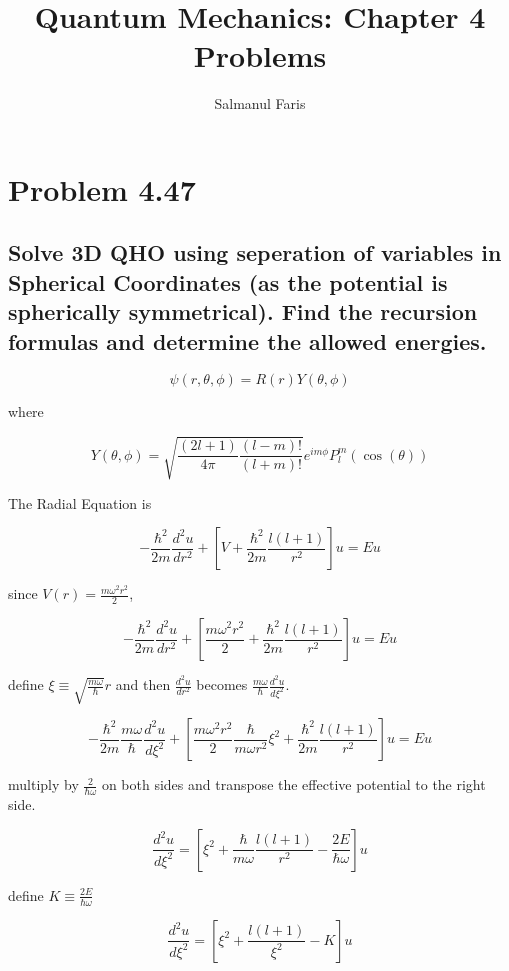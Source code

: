 \documentclass[a4paper,15pt]{article}
\title{Quantum Mechanics: Chapter 4 Problems}
\author{Salmanul Faris}
\begin{document}
\maketitle

\section*{Problem 4.47}
\subsection*{Solve 3D QHO using seperation of variables in
Spherical Coordinates (as the potential is spherically symmetrical).
Find the recursion formulas and determine the allowed energies.}

\begin{equation}
  \psi(r, \theta, \phi) = R(r)Y(\theta, \phi)
\end{equation}

where

\begin{equation}
  Y(\theta, \phi) = \sqrt{\frac{(2l+1)}{4\pi}\frac{(l-m)!}
  {(l+m)!}}e^{im\phi}P^m_l(\cos(\theta))
\end{equation}

The Radial Equation is

\[
  -\frac{\hbar^2}{2m}\frac{d^2u}{dr^2}+\left[V+\frac{\hbar^2}{2m}\frac{l(l+1)}{r^2}\right]
  u = Eu
\]

since $V(r)=\frac{m\omega^2r^2}{2}$,

\[
  -\frac{\hbar^2}{2m}\frac{d^2u}{dr^2}+\left[\frac{m\omega^2r^2}{2}+\frac{\hbar^2}{2m}\frac{l(l+1)}{r^2}\right]
  u = Eu
\]

define \(\xi \equiv \sqrt{\frac{m \omega}{\hbar}}r\) and then \(\frac{d^2u}{dr^2}\) becomes
\( \frac{m\omega}{\hbar}\frac{d^2u}{d\xi^2} \).

\[
  -\frac{\hbar^2}{2m}\frac{m\omega}{\hbar}\frac{d^2u}{d\xi^2}+\left[\frac
  {m\omega^2r^2}{2}\frac{\hbar}{m \omega r^2} \xi^2+\frac{\hbar^2}{2m}\frac{l(l+1)}{r^2}\right]u = Eu
\]

multiply by \(\frac{2}{\hbar \omega}\) on both sides and transpose
the effective potential to the right side.

\[
  \frac{d^2u}{d\xi^2}=\left[\xi^2+\frac{\hbar}{m \omega}\frac{l(l+1)}{r^2}
  -\frac{2E}{\hbar \omega}\right]u
\]

define \(K \equiv \frac{2E}{\hbar \omega}\)

\begin{equation}
  \frac{d^2u}{d\xi^2}=\left[\xi^2+\frac{l(l+1)}{\xi^2}-K\right]u
\end{equation}
\end{document}
